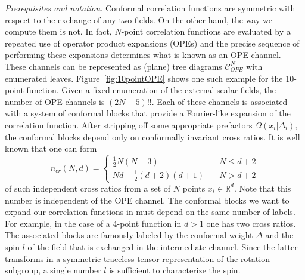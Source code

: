 \documentclass{article}
\begin{document}
\noindent 
\textit{Prerequisites and notation.} 
Conformal correlation functions are symmetric with respect to the exchange of any two 
fields. On the other hand, the way we compute them is not. In fact, $N$-point correlation 
functions are evaluated by a repeated use of operator product expansions (OPEs) and the 
precise sequence of performing these expansions determines what is known as an OPE channel. 
These channels can be represented as (plane) tree diagrams $\mathcal{C}^N_\textit{OPE}$ 
with enumerated leaves. Figure~\ref{fig:10pointOPE} shows one such example for the 10-point function. Given 
a fixed enumeration of the external scalar fields, the number of OPE channels is 
$(2N-5)!!$. Each of these channels is associated with a system of conformal blocks that 
provide a Fourier-like expansion of the correlation function. After stripping off some 
appropriate prefactors $\Omega(x_i|\Delta_i)$, the conformal blocks depend only on 
conformally invariant cross ratios. It is well known that one can form 
\begin{equation}
n_\textit{cr} (N,d) = \left\{ \begin{array}{ll} \frac12 N (N-3) \quad & N \leq d + 2 \\[3mm] 
Nd - \frac12(d+2)(d+1) \quad &  N > d + 2 \end{array} \right.  
\end{equation} 
of such independent cross ratios from a set of $N$ points $x_i \in \mathbb{R}^d$. Note 
that this number is independent of the OPE channel. The conformal blocks we want to 
expand our correlation functions in must depend on the same number of labels. For example, 
in the case of a 4-point function in $d>1$ one has two cross ratios. The associated 
blocks are famously labeled by the conformal weight $\Delta$ and the spin $l$ of the 
field that is exchanged in the intermediate channel. Since the latter transforms in a 
symmetric traceless tensor representation of the rotation subgroup, a single number 
$l$ is sufficient to characterize the spin. 
\end{document}
